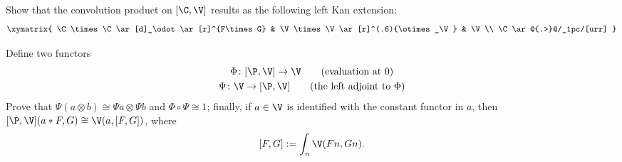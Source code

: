 \begin{exerciseset}
\begin{exercisepoints}
\item Show that the convolution product on $[\C, \V]$ results as the following left Kan extension:
\[
\xymatrix{
	\C \times \C \ar[d]_\odot \ar[r]^{F\times G} & \V \times \V \ar[r]^(.6){\otimes_\V} & \V \\
	\C \ar@{.>}@/_1pc/[urr]
}
\]
\item Define two functors
\begin{gather*}
\Phi\colon [\P,\V]\to \V \qquad \text{(evaluation at $0$)}\\
\Psi\colon \V \to [\P,\V]\qquad \text{(the left adjoint to } \Phi)
\end{gather*}
Prove that $\Psi(a\otimes b)\cong \Psi a\otimes \Psi b$ and $\Phi\circ\Psi\cong 1$; finally, if $a\in \V$ is identified with the constant functor in $a$, then $[\P,\V](a\ast F,G)\cong \V(a,[F,G])$, where
\[
[F,G] := \int_n \V(Fn, Gn).
\]
\end{exercisepoints}
\end{exerciseset}